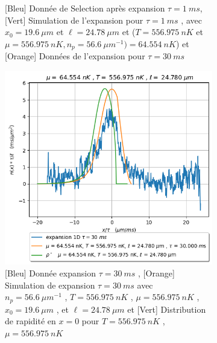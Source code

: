 \documentclass[a3, 10pt,twoside]{article}          %
\theoremstyle{plain}
\theoremstyle{definition}
\theoremstyle{remark}
\theoremstyle{definition} %
\def\OliveGreen{OliveGreen}
\begin{document}
\begin{figure}[H]
\begin{subfigure}[b]{0.45\textwidth}
        		\caption{{\color{blue}[Bleu] Donnée de Selection après expansion $\tau = 1~ms$}, {\color{OliveGreen}[Vert]  Simulation de l'expansion pour $\tau= 1~ms$  , avec $x_0 = 19.6~\mu m$ et $\ell = 24.78~\mu m$ et ($T = 556.975 ~nK$ et $\mu=556.975 ~nK  , n_p = 56.6 ~{\mu m}^{-1} )= 64.554~nK$)} et { \color{orange}[Orange] Données de l'expansion pour $\tau = 30~ms$  } }
        		\label{fig4:expansion1}
    		\end{subfigure}
    		
    		\vspace{1em}
    		
     		\begin{subfigure}[b]{0.45\textwidth}
        		\centering
        		\includegraphics[width=\textwidth]{Figures/simul_expansion_30_24-04-2024}
        		\caption{{\color{blue}[Bleu] Donnée  expansion $\tau = 30~ms$} , {\color{orange}[Orange] Simulation de  expansion $\tau = 30~ms$ avec $n_p = 56.6 ~{\mu m}^{-1}$ , $T = 556.975 ~nK$ , $\mu=556.975 ~nK$ , $x_0 = 19.6~\mu m$ , et $\ell = 24.78~\mu m$} et {\color{\OliveGreen}[Vert] Distribution de rapidité en $x = 0$ pour  $T = 556.975 ~nK$ , $\mu=556.975 ~nK$} }
        		\label{fig4:expansion30}
    		\end{subfigure}
    		\hfill
    		\begin{subfigure}[b]{0.45\textwidth}
        		\centering

\end{subfigure}
\end{figure}
\end{document}
